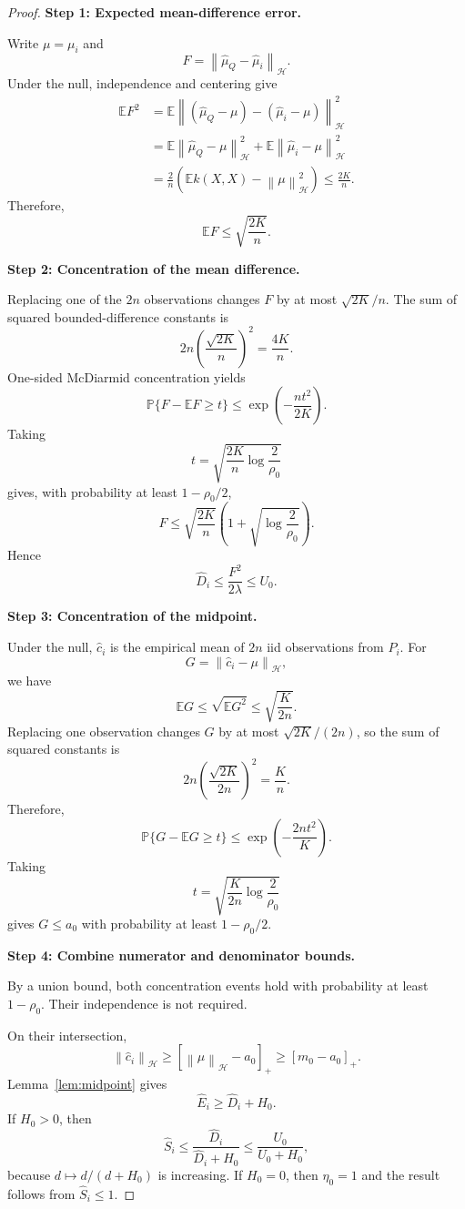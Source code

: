 \documentclass[11pt]{article}
\newcommand{\HH}{\mathcal H}
\newcommand{\E}{\mathbb E}
\newcommand{\Prob}{\mathbb P}
\newcommand{\norm}[1]{\left\lVert #1\right\rVert_{\HH}}
\newcommand{\proofstep}[1]{%
  \par\smallskip
  \noindent\textbf{#1}\enspace\ignorespaces
}
\begin{document}
\begin{proof}
\proofstep{Step 1: Expected mean-difference error.}
Write $\mu=\mu_i$ and
\[
F=\norm{\widehat\mu_Q-\widehat\mu_i}.
\]
Under the null, independence and centering give
\[
\begin{aligned}
\E F^2
&=
\E\norm{(\widehat\mu_Q-\mu)-(\widehat\mu_i-\mu)}^2\\
&=
\E\norm{\widehat\mu_Q-\mu}^2
+\E\norm{\widehat\mu_i-\mu}^2\\
&=\frac2n\left(\E k(X,X)-\norm{\mu}^2\right)
\le\frac{2K}{n}.
\end{aligned}
\]
Therefore,
\[
\E F\le\sqrt{\frac{2K}{n}}.
\]

\proofstep{Step 2: Concentration of the mean difference.}
Replacing one of the $2n$ observations changes $F$
by at most $\sqrt{2K}/n$. The sum of squared
bounded-difference constants is
\[
2n\left(\frac{\sqrt{2K}}n\right)^2=\frac{4K}{n}.
\]
One-sided McDiarmid concentration yields
\[
\Prob\{F-\E F\ge t\}
\le\exp\left(-\frac{nt^2}{2K}\right).
\]
Taking
\[
t=\sqrt{\frac{2K}{n}\log\frac2{\rho_0}}
\]
gives, with probability at least $1-\rho_0/2$,
\[
F\le\sqrt{\frac{2K}{n}}
\left(1+\sqrt{\log\frac2{\rho_0}}\right).
\]
Hence
\[
\widehat D_i\le\frac{F^2}{2\lambda}\le U_0.
\]

\proofstep{Step 3: Concentration of the midpoint.}
Under the null, $\widehat c_i$ is the empirical mean
of $2n$ iid observations from $P_i$.
For
\[
G=\norm{\widehat c_i-\mu},
\]
we have
\[
\E G\le\sqrt{\E G^2}\le\sqrt{\frac K{2n}}.
\]
Replacing one observation changes $G$ by at most
$\sqrt{2K}/(2n)$, so the sum of squared constants is
\[
2n\left(\frac{\sqrt{2K}}{2n}\right)^2=\frac Kn.
\]
Therefore,
\[
\Prob\{G-\E G\ge t\}
\le\exp\left(-\frac{2nt^2}{K}\right).
\]
Taking
\[
t=\sqrt{\frac K{2n}\log\frac2{\rho_0}}
\]
gives $G\le a_0$ with probability at least $1-\rho_0/2$.

\proofstep{Step 4: Combine numerator and denominator bounds.}
By a union bound, both concentration events hold with
probability at least $1-\rho_0$.
Their independence is not required.

On their intersection,
\[
\norm{\widehat c_i}
\ge[\norm{\mu}-a_0]_+
\ge[m_0-a_0]_+.
\]
Lemma~\ref{lem:midpoint} gives
\[
\widehat E_i\ge\widehat D_i+H_0.
\]
If $H_0>0$, then
\[
\widehat S_i
\le\frac{\widehat D_i}{\widehat D_i+H_0}
\le\frac{U_0}{U_0+H_0},
\]
because $d\mapsto d/(d+H_0)$ is increasing.
If $H_0=0$, then $\eta_0=1$ and the result follows
from $\widehat S_i\le1$.
\end{proof}
\end{document}
